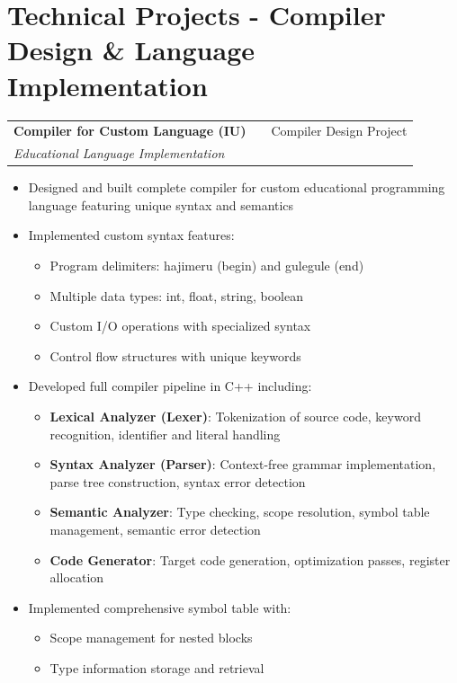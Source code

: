 \documentclass[a4paper,12pt]{article}
\makeatletter
\newenvironment{projectdetailed}[3]
    {
    \begin{tabularx}{\linewidth}{@{}l X r@{}}
    \textbf{#1} & \hfill & #2 \\
    \textit{#3} & & \\[3.75pt]
    \end{tabularx}
    \begin{minipage}[t]{\linewidth}
    \begin{itemize}[nosep,after=\strut, leftmargin=1em, itemsep=2pt,label=--]
    }
    {
    \end{itemize}
    \end{minipage}
    \vspace{6pt}
    }
\makeatother
\begin{document}
\section{Technical Projects - Compiler Design \& Language Implementation}

\begin{projectdetailed}{Compiler for Custom Language (IU)}{Compiler Design Project}{Educational Language Implementation}
\item Designed and built complete compiler for custom educational programming language featuring unique syntax and semantics
\item Implemented custom syntax features:
\begin{itemize}[nosep, leftmargin=2em]
    \item Program delimiters: hajimeru (begin) and gulegule (end)
    \item Multiple data types: int, float, string, boolean
    \item Custom I/O operations with specialized syntax
    \item Control flow structures with unique keywords
\end{itemize}
\item Developed full compiler pipeline in C++ including:
\begin{itemize}[nosep, leftmargin=2em]
    \item \textbf{Lexical Analyzer (Lexer)}: Tokenization of source code, keyword recognition, identifier and literal handling
    \item \textbf{Syntax Analyzer (Parser)}: Context-free grammar implementation, parse tree construction, syntax error detection
    \item \textbf{Semantic Analyzer}: Type checking, scope resolution, symbol table management, semantic error detection
    \item \textbf{Code Generator}: Target code generation, optimization passes, register allocation
\end{itemize}
\item Implemented comprehensive symbol table with:
\begin{itemize}[nosep, leftmargin=2em]
    \item Scope management for nested blocks
    \item Type information storage and retrieval

\end{itemize}
\end{projectdetailed}
\end{document}
